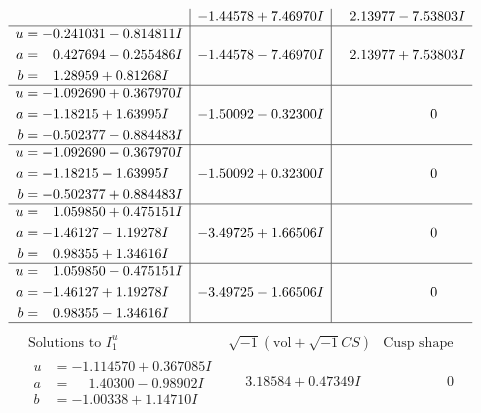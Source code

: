 \documentclass[1p]{elsarticle_modified}
\theoremstyle{definition}
\newcommand{\I}{\sqrt{-1}}
\begin{document}
$$\begin{array}{c|c|c}
 & -1.44578 + 7.46970 I & \phantom{-}2.13977 - 7.53803 I \\ \hline\begin{aligned}
u &= -0.241031 - 0.814811 I \\
a &= \phantom{-}0.427694 - 0.255486 I \\
b &= \phantom{-}1.28959 + 0.81268 I\end{aligned}
 & -1.44578 - 7.46970 I & \phantom{-}2.13977 + 7.53803 I \\ \hline\begin{aligned}
u &= -1.092690 + 0.367970 I \\
a &= -1.18215 + 1.63995 I \\
b &= -0.502377 - 0.884483 I\end{aligned}
 & -1.50092 - 0.32300 I & \phantom{-0.000000 } 0 \\ \hline\begin{aligned}
u &= -1.092690 - 0.367970 I \\
a &= -1.18215 - 1.63995 I \\
b &= -0.502377 + 0.884483 I\end{aligned}
 & -1.50092 + 0.32300 I & \phantom{-0.000000 } 0 \\ \hline\begin{aligned}
u &= \phantom{-}1.059850 + 0.475151 I \\
a &= -1.46127 - 1.19278 I \\
b &= \phantom{-}0.98355 + 1.34616 I\end{aligned}
 & -3.49725 + 1.66506 I & \phantom{-0.000000 } 0 \\ \hline\begin{aligned}
u &= \phantom{-}1.059850 - 0.475151 I \\
a &= -1.46127 + 1.19278 I \\
b &= \phantom{-}0.98355 - 1.34616 I\end{aligned}
 & -3.49725 - 1.66506 I & \phantom{-0.000000 } 0\\
 \hline 
 \end{array}$$\newpage$$\begin{array}{c|c|c}  
\text{Solutions to }I^u_{1}& \I (\text{vol} + \sqrt{-1}CS) & \text{Cusp shape}\\
 \hline 
\begin{aligned}
u &= -1.114570 + 0.367085 I \\
a &= \phantom{-}1.40300 - 0.98902 I \\
b &= -1.00338 + 1.14710 I\end{aligned}
 & \phantom{-}3.18584 + 0.47349 I & \phantom{-0.000000 } 0 \\ \hline\begin{aligned}

\end{aligned}
\end{array}$$
\end{document}

